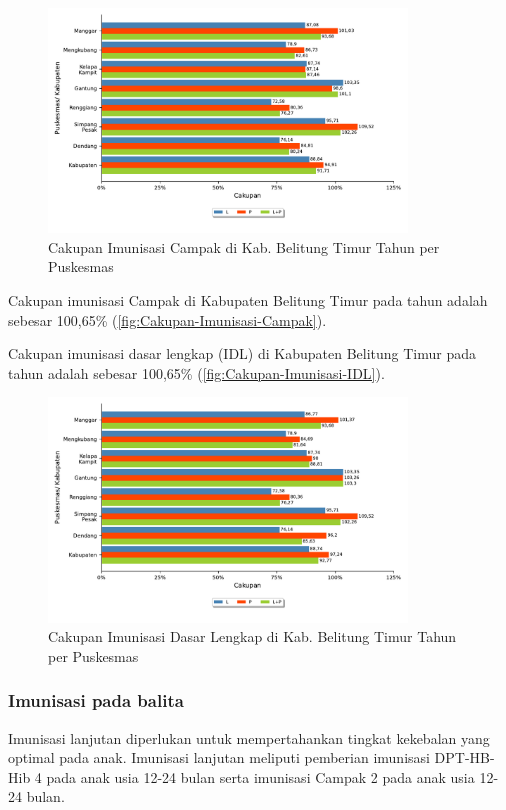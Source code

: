 \begin{figure}[H]
    \centering
    \includegraphics[width=0.85\textwidth]{bab_05/bab_05_20a_imunCampak}
    \caption{Cakupan Imunisasi Campak di Kab. Belitung Timur Tahun \tP per Puskesmas}
    \label{fig:Cakupan-Imunisasi-Campak}
\end{figure}

Cakupan imunisasi Campak di Kabupaten Belitung Timur pada tahun \tP adalah sebesar 100,65\% (\autoref{fig:Cakupan-Imunisasi-Campak}).

Cakupan imunisasi dasar lengkap (IDL) di Kabupaten Belitung Timur pada tahun \tP adalah sebesar 100,65\% (\autoref{fig:Cakupan-Imunisasi-IDL}).

\begin{figure}[H]
    \centering
    \includegraphics[width=0.85\textwidth]{bab_05/bab_05_20b_imunIDL}
    \caption{Cakupan Imunisasi Dasar Lengkap di Kab. Belitung Timur Tahun \tP per Puskesmas}
    \label{fig:Cakupan-Imunisasi-IDL}
\end{figure}

\subsubsection{Imunisasi pada balita}
Imunisasi lanjutan diperlukan untuk mempertahankan tingkat kekebalan yang optimal pada anak.
Imunisasi lanjutan meliputi pemberian imunisasi DPT-HB-Hib 4 pada anak usia 12-24 bulan serta imunisasi Campak 2 pada anak usia 12-24 bulan.


